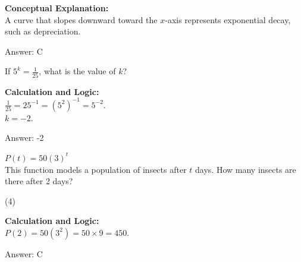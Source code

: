 \documentclass[11pt,paper=a4,answers]{exam}
\begin{document}
\begin{questions}
\begin{solution}
\textbf{Conceptual Explanation:} \\
A curve that slopes downward toward the $x$-axis represents exponential decay, such as depreciation.

\vspace{25pt}

Answer: \colorbox{yellow!100}{C}
\end{solution}

\vspace{40pt}

\question
If $5^k = \frac{1}{25}$, what is the value of $k$?

\begin{solution}
\textbf{Calculation and Logic:} \\
$\frac{1}{25} = 25^{-1} = (5^2)^{-1} = 5^{-2}$. \\
$k = -2$.

\vspace{25pt}

Answer: \colorbox{yellow!100}{-2}
\end{solution}

\vspace{40pt}

\question
$P(t) = 50(3)^t$ \\
This function models a population of insects after $t$ days. How many insects are there after 2 days?
\begin{tasks}(4)
\end{tasks}

\begin{solution}
\textbf{Calculation and Logic:} \\
$P(2) = 50(3^2) = 50 \times 9 = 450$.

\vspace{25pt}

Answer: \colorbox{yellow!100}{C}
\end{solution}

\vspace{40pt}


\end{questions}
\end{document}
